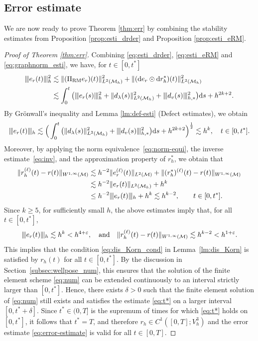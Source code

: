 \documentclass[11pt,a4paper,oneside,reqno]{amsart}
\theoremstyle{definition}
\theoremstyle{plain}
\numberwithin{theorem}{section}
\numberwithin{proposition}{section}
\numberwithin{lemma}{section}
\numberwithin{equation}{section}
\newcommand{\Man}{\mathcal{M}}
\newcommand{\RM}{\mathrm{RM}}
\newcommand{\normt}[1]{%
	\vert\kern-0.9pt\vert\kern-0.9pt\vert #1
	\vert\kern-0.9pt\vert\kern-0.9pt\vert}
\begin{document}
\subsection{Error estimate}
We are now ready to prove Theorem \ref{thm:err} by combining the stability estimates from Proposition \ref{prop:esti_drder} and Proposition \ref{prop:esti_eRM}. 

\begin{proof}[Proof of Theorem \ref{thm:err}]  
Combining \eqref{eq:esti_drder}, \eqref{eq:esti_eRM} and \eqref{eq:graphnorm_esti}, we have, for $t \in [0,t^*]$ 
\[ \begin{aligned}
    \normt{e_r(t)}^2_h & \lesssim 
     \|  (\Pi_{\RM} e_r)(t)\|_{L^2(\Man_h)}^2 + \|(\mathrm{d} e_{r} \odot \mathrm{d} r_h^*)(t)\|_{L^2(\Man_h)}^2 \\ 
    & \lesssim \int_0^t \big( 
\normt{e_r(s)}^2_h + \| d_\lambda(s) \|_{L^2(\Man_h)}^2 + \normt{d_v(s)}_{h,*}^2 \big)\mathrm{d}s + h^{2k+2}. 
\end{aligned} \]
By Gr\"onwall's inequality and Lemma \ref{lm:def-esti} (Defect estimates), we obtain
\begin{equation}\label{eq:error-estimate} 
\normt{e_r(t)}_h \lesssim 
 \Big(\int_0^t \big( 
 \| d_\lambda(s) \|_{L^2(\Man_h)}^2 + \normt{d_v(s)}_{h,*}^2 \big)\mathrm{d}s
+h^{2k+2}\Big)^{\frac{1}{2}} \lesssim h^{k}, \quad t \in [0,t^*].
\end{equation} 
Moreover, by applying the norm equivalence~\eqref{eq:norm-equi}, 
the inverse estimate~\eqref{eq:inv}, 
and the approximation property of $r_h^*$, 
we obtain that
\[
\begin{aligned}
\| r_h^{(\ell)}(t) - r(t) \|_{W^{1,\infty}(\Man)}
&\lesssim 
h^{-2}\| e_r^{(\ell)}(t) \|_{L^2(\Man)}
+ \| (r_h^*)^{(\ell)}(t) - r(t) \|_{W^{1,\infty}(\Man)} \\
&\lesssim 
h^{-2} \| e_r(t) \|_{L^2(\Man_h)}
+ h^{k} \\
&\le 
h^{-2}\normt{e_r(t)}_h
+ h^{k}
\lesssim h^{k-2},
\qquad t \in [0,t^*].
\end{aligned}
\]
Since \(k \ge 5\), for sufficiently small \(h\), the above estimates imply that, for all \(t \in [0, t^*]\),
\[ \normt{e_r(t)}_h \lesssim h^k < h^{4 + \varepsilon}, \quad \text{and} \quad \|r_h^{(\ell)}(t) - r(t)\|_{W^{1, \infty}(\Man)} \lesssim h^{k-2} < h^{1+\varepsilon}. \]
This implies that the condition \eqref{eq:dis_Korn_cond} in Lemma~\ref{lm:dis_Korn} is satisfied by \(r_h(t)\)
for all \(t \in [0,t^*]\).
By the discussion in Section~\ref{subsec:wellpose_num}, this ensures that the solution of the finite element scheme
\eqref{eq:num} can be extended continuously to an interval strictly larger than \([0,t^*]\). 
Hence, there exists \(\delta > 0\) such that the finite element solution of \eqref{eq:num} still exists and satisfies the estimate \eqref{eq:t*} on a larger interval \([0, t^* + \delta]\).
Since \(t^* \in (0, T]\) is the supremum of times for which \eqref{eq:t*} holds on \([0, t^*]\), it follows that \(t^* = T\), and therefore $ r_h \in C^1([0,T]; V_h^3) $ and the error estimate \eqref{eq:error-estimate} is valid for all \(t \in [0, T]\).


\end{proof}
\end{document}
